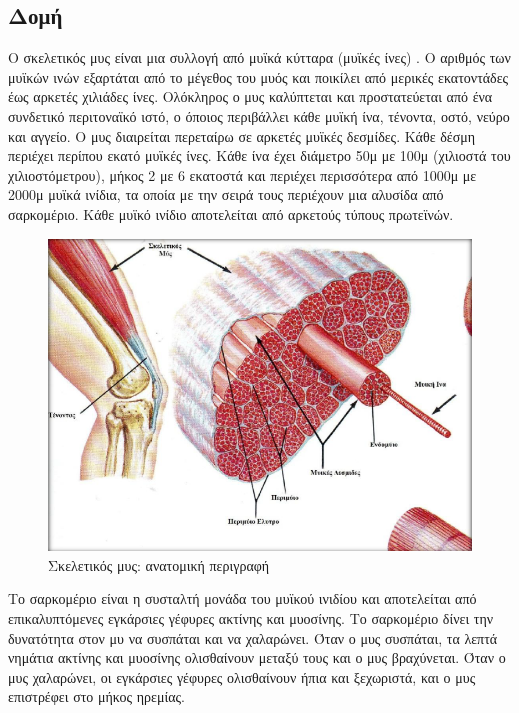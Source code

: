 \subsection{Δομή}

Ο σκελετικός μυς είναι μια συλλογή από μυϊκά κύτταρα (μυϊκές ίνες) \cite{zirinoglou}. Ο αριθμός των μυϊκών ινών εξαρτάται από το μέγεθος του μυός και ποικίλει από μερικές εκατοντάδες έως αρκετές χιλιάδες ίνες. Ολόκληρος ο μυς καλύπτεται και προστατεύεται από ένα συνδετικό περιτοναϊκό ιστό, ο όποιος περιβάλλει κάθε μυϊκή ίνα, τένοντα, οστό, νεύρο και αγγείο. Ο μυς διαιρείται περεταίρω σε αρκετές μυϊκές δεσμίδες. Κάθε δέσμη περιέχει περίπου εκατό μυϊκές ίνες. Κάθε ίνα έχει διάμετρο 50μ με 100μ (χιλιοστά του χιλιοστόμετρου), μήκος 2 με 6 εκατοστά και περιέχει περισσότερα από 1000μ με 2000μ μυϊκά ινίδια, τα οποία με την σειρά τους περιέχουν μια αλυσίδα από σαρκομέριο. Κάθε μυϊκό ινίδιο αποτελείται από αρκετούς τύπους πρωτεϊνών.

\begin{figure}[H]
    \centering
    \includegraphics[width=.8\textwidth, height=0.5\textheight, keepaspectratio]{fig/muscle-fysiology.png}
    \caption{Σκελετικός μυς: ανατομική περιγραφή\protect\footnotemark}
    \label{fig:muscle-fysiology}
\end{figure}

Το σαρκομέριο είναι η συσταλτή μονάδα του μυϊκού ινιδίου και αποτελείται από επικαλυπτόμενες εγκάρσιες γέφυρες ακτίνης και μυοσίνης. Το σαρκομέριο δίνει την δυνατότητα στον μυ να συσπάται και να χαλαρώνει. Όταν ο μυς συσπάται, τα λεπτά νημάτια ακτίνης και μυοσίνης ολισθαίνουν μεταξύ τους και ο μυς βραχύνεται. Όταν ο μυς χαλαρώνει, οι εγκάρσιες γέφυρες ολισθαίνουν ήπια και ξεχωριστά, και ο μυς επιστρέφει στο μήκος ηρεμίας.

